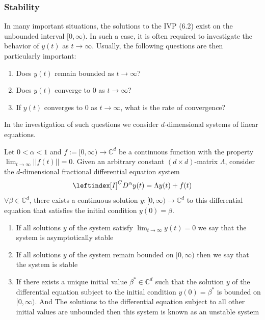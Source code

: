 \subsubsection{Stability}
In many important situations, the solutions to the IVP (6.2) exist on
the unbounded interval $[0,\infty)$. In such a case, it is often required to investigate the behavior of
$y(t)$ as $t \to \infty$. Usually, the following questions are then particularly important:
\begin{enumerate}
    \item Does $y(t)$ remain bounded as $t \to \infty$?
    \item Does $y(t)$ converge to $0$ as $t \to \infty$?
    \item If $y(t)$ converges to $0$ as $t \to \infty$, what is the rate of convergence?
\end{enumerate}
In the investigation of such questions we consider $d$-dimensional systems of linear equations.
\begin{theorem}[]
    Let $0<\alpha<1$ and $f := [0,\infty) \to \mathbb{C}^d$ be a continuous function with the
    property $\displaystyle \lim_{t\to\infty} ||f(t)|| = 0$. Given an arbitrary constant $(d\times d)$-matrix $\Lambda$, consider the
    $d$-dimensional fractional differential equation system
    \[
        \leftindex[I]^C {D^{\alpha}} y(t) = \Lambda y(t) + f(t)    
    \]
    $\forall \beta \in \mathbb{C}^d$, there exists a continuous solution $y : [0,\infty) \to \mathbb{C}^d$ 
        to this differential equation that satisfies the initial condition $y(0) = \beta$.
    \begin{enumerate}[label=(\alph*)]
        \item If all solutions $y$ of the system satisfy $\displaystyle \lim_{t\to\infty} y(t) = 0$ we say that the system is asymptotically stable
        \\
        \item If all solutions $y$ of the system remain bounded on $[0,\infty)$ then we say that the system is stable
        \\
        \item If there exists a unique initial value $\beta^* \in \mathbb{C}^d$ such that the solution $y$ of the differential 
        equation subject to the initial condition $y(0) = \beta^*$ is bounded on $[0,\infty)$. 
        And The solutions to the differential equation subject to all other initial values are unbounded then this system is 
        known as an unstable system
    \end{enumerate}
\end{theorem}

